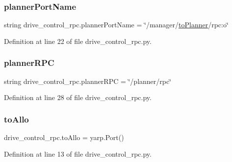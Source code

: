 \subsubsection{\texorpdfstring{planner\+Port\+Name}{plannerPortName}}
{\footnotesize\ttfamily string drive\+\_\+control\+\_\+rpc.\+planner\+Port\+Name = \char`\"{}/manager/\hyperlink{namespacedrive__control__rpc_a4b139dc4cf2516862cb2860fc6fdc7b7}{to\+Planner}/rpc\+:o\char`\"{}}



Definition at line 22 of file drive\+\_\+control\+\_\+rpc.\+py.

\mbox{\label{namespacedrive__control__rpc_a5040c9c692daba5e981ee0ff844f9202}} 
\subsubsection{\texorpdfstring{planner\+R\+PC}{plannerRPC}}
{\footnotesize\ttfamily string drive\+\_\+control\+\_\+rpc.\+planner\+R\+PC = \char`\"{}/planner/rpc\char`\"{}}



Definition at line 28 of file drive\+\_\+control\+\_\+rpc.\+py.

\mbox{\label{namespacedrive__control__rpc_a0e43be475c3d74c9ca8920fae92596de}} 
\subsubsection{\texorpdfstring{to\+Allo}{toAllo}}
{\footnotesize\ttfamily drive\+\_\+control\+\_\+rpc.\+to\+Allo = yarp.\+Port()}



Definition at line 13 of file drive\+\_\+control\+\_\+rpc.\+py.

\mbox{\label{namespacedrive__control__rpc_aa4a8cdca551c7850b14c6973b6229e1e}} 
